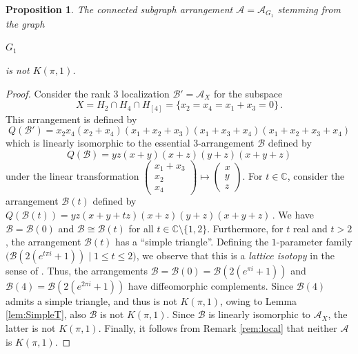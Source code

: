 \documentclass[12pt]{amsart}
\newcommand\CA{{\mathscr A}}
\newcommand\CB{{\mathscr B}}
\newcommand\BBC{{\mathbb C}}
\numberwithin{equation}{section}
\theoremstyle{plain}
\newtheorem{prop}[equation]{Proposition}
\theoremstyle{definition}
\begin{document}
\begin{prop}
\label{prop:g1}
  The connected subgraph arrangement $\CA=\CA_{G_1}$ stemming from the graph
  \begin{center}
  	{$G_1$}
  \end{center}
  is not $K(\pi, 1)$.
\end{prop}
\begin{proof}
  Consider the rank $3$ localization $\CB'=\CA_X$ for the subspace
  $$X= H_{2}\cap H_{4}\cap H_{[4]} = \{x_2=x_4=x_1+
  x_3 = 0\}\,.$$
  This arrangement is defined by
  $$Q(\CB') = x_2x_4(x_2+x_4)(x_1+x_2+x_3)(x_1+x_3+x_4)(x_1+x_2+x_3+x_4)$$
  which is linearly isomorphic to the essential $3$-arrangement $\CB$ defined by
  $$Q(\CB) = yz(x+y)(x+z)(y+z)(x+y+z)$$
  under the linear transformation
  $\begin{pmatrix}x_1+x_3 \\ x_2 \\ x_4 \end{pmatrix}
  \mapsto
  \begin{pmatrix} x\\y\\z \end{pmatrix}$.
  For $t\in \BBC$, consider the arrangement $\CB(t)$ defined by
  $Q(\CB(t)) = yz(x+y+tz)(x+z)(y+z)(x+y+z)\,.$
  We have $\CB = \CB(0)$ and $\CB \cong \CB(t)$ for all $t\in \BBC \setminus \{1,2\}$.
  Furthermore, for $t$ real and $t>2$, the arrangement $\CB(t)$ has a ``simple triangle''.
  Defining the $1$-parameter family $\Big(\CB(2(e^{t\pi i}+1)) \mid 1\leq t \leq 2\Big)$, we observe that this is a \emph{lattice isotopy} in the sense of \cite{randell:lattice-isotopy}.
  Thus, the arrangements $\CB = \CB(0) = \CB(2(e^{\pi i}+1))$ and $\CB(4) = \CB(2(e^{2\pi i}+1))$ have diffeomorphic complements.
  Since $\CB(4)$ admits a simple triangle, and thus is not 
  $K(\pi, 1)$, owing to Lemma \ref{lem:SimpleT}, also 
  $\CB$ is not $K(\pi, 1)$.
  Since $\CB$ is linearly isomorphic to $\CA_X$, the latter is not $K(\pi, 1)$. Finally, it follows from Remark \ref{rem:local}
  that neither $\CA$ is $K(\pi, 1)$.
\end{proof}
\end{document}
